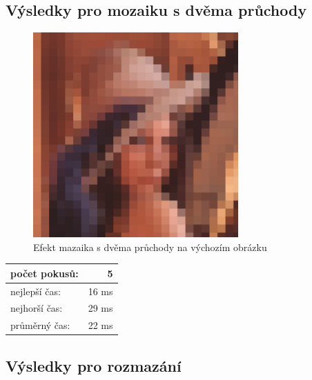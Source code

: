 \documentclass[12pt]{scrartcl}
\begin{document}
\newpage
\subsection{Výsledky pro mozaiku s dvěma průchody}

\begin{figure}[!ht]
	\centering
	\label{obr:mosaicdouble}
	\includegraphics[width=0.7\textwidth,natwidth=1,natheight=1]{mosaic_double.pdf}
	\caption{Efekt mazaika s dvěma průchody na výchozím obrázku}
\end{figure}	

\begin{center}
  \begin{tabular}{ | l | r | }
    \hline
    počet pokusů: & 5 \\ \hline
    nejlepší čas: & 16 ms \\ \hline
    nejhorší čas: & 29 ms \\ \hline
    průměrný čas: & 22 ms \\
    \hline
  \end{tabular}
\end{center}

\newpage
\subsection{Výsledky pro rozmazání}
\end{document}
